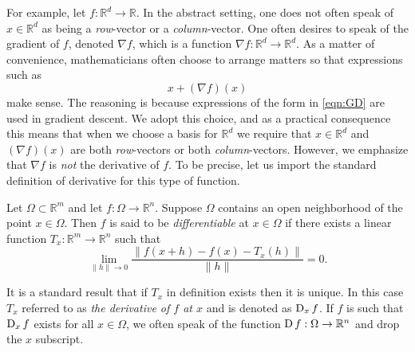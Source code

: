     For example, let \(f:\mathbb{R}^d \to \mathbb{R}\). In the abstract
    setting, one does not often speak of \(x \in \mathbb{R}^d\) as
    being a \emph{row}-vector or a \emph{column}-vector. One
    often desires to speak of the gradient of \(f\), denoted \(\nabla f\),
    which is a function \(\nabla f:\mathbb{R}^d \to \mathbb{R}^d\).
    As a matter of convenience, mathematicians often choose to arrange matters 
    so that expressions such as
    \begin{equation}
        x + (\nabla f)(x)
        \label{eqn:GD}
    \end{equation}
    make sense. The reasoning is because expressions of the form in \autoref{eqn:GD} 
    are used in gradient descent. We adopt this choice, and as a practical
    consequence this means that when we choose a basis for \(\mathbb{R}^d\)
    we require that \(x \in \mathbb{R}^d\) and \((\nabla f)(x)\) are
    both \emph{row}-vectors or both \emph{column}-vectors. However, we emphasize
    that \(\nabla f\) is \emph{not} the derivative of \(f\). To be
    precise, let us import the standard definition of derivative for
    this type of function.
    \begin{definition}[Differentiability]
        \label{def:Deriv}
        Let \(\Omega \subset \mathbb{R}^m\) and let \(f:\Omega \to \mathbb{R}^n\). Suppose
        \(\Omega\) contains an open neighborhood of the point \(x \in \Omega\). Then
        \(f\) is said to be \emph{differentiable} at \(x \in \Omega\) if there
        exists a linear function \(T_x:\mathbb{R}^m \to \mathbb{R}^n\) such that
        \[
            \lim_{\|h\| \to 0} \frac{\|f(x + h) - f(x) - T_x(h)\|}{\|h\|} = 0.
        \]
    \end{definition}
    It is a standard result that if \(T_x\) in definition  exists
    then it is unique. In this case \(T_x\) referred to as \emph{the derivative of \(f\) at \(x\)}
    and is denoted as \(\operatorname{D}_x f\). If \(f\) is such that \(\operatorname{D}_x f\) exists 
    for all \(x \in \Omega\), we often speak of the function \(\operatorname{D} f:\Omega \to \mathbb{R}^n\)
    and drop the \(x\) subscript.
   
